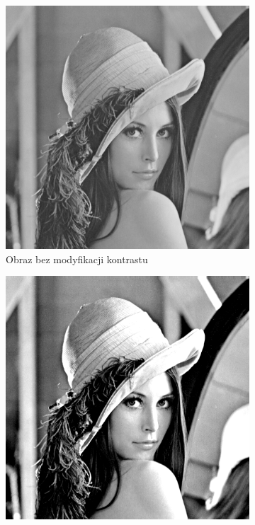 \documentclass[a4paper, 12pt, polish, twoside]{extreport}
\begin{document}
        \begin{figure}[H] 
            \centering
            \begin{subfigure}{0.49\textwidth}
                \centering
                \includegraphics[width = \textwidth]{img/2-theory/lenna10.png}
                \caption{Obraz bez modyfikacji kontrastu}
                \label{theory-contrast-lenna-a}
            \end{subfigure}
            \begin{subfigure}{0.49\textwidth}
                \centering
                \includegraphics[width = \textwidth]{img/2-theory/lenna20.png}

\end{subfigure}
\end{figure}
\end{document}
